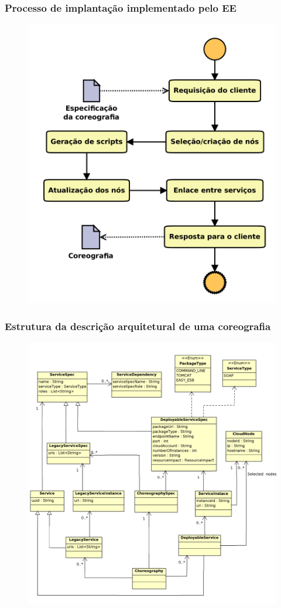 \documentclass{beamer}
\begin{document}
\begin{frame}
\frametitle{Processo de implantação implementado pelo EE}

\begin{figure}
\includegraphics[width=0.55\linewidth]{img/processo}
\end{figure}

\end{frame}


\begin{frame}
\frametitle{Estrutura da descrição arquitetural de uma coreografia}

\begin{figure}
\includegraphics[width=0.6\linewidth]{img/adl}
\end{figure}

\end{frame}

\end{document}

